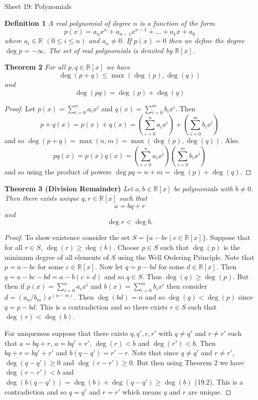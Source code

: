 \documentclass{article}
\begin{document}
\begin{flushleft}

\Large

Sheet 19: Polynomials\newline

\normalsize

\textbf{Definition 1}
\textsl{A real polynomial of degree $n$ is a function of the form
\[
p(x) = a_n x^n + a_{n-1} x^{n-1} + \dots + a_1 x + a_0
\]
where $a_i \in \mathbb{R}$ $(0 \leq i \leq n)$ and $a_n \neq 0$. If $p(x) = 0$ then we define the degree $\deg p = - \infty$. The set of real polynomials is denoted by $\mathbb{R}[x]$.}\newline

\textbf{Theorem 2}
\textsl{For all $p,q \in \mathbb{R}[x]$ we have
\[
\deg(p+q) \leq \max(\deg(p), \deg(q))
\]
and
\[
\deg(pq) = \deg(p) + \deg(q)
\]}
\begin{proof}
Let $p(x) = \sum_{i=0}^n a_i x^i$ and $q(x) = \sum_{i=0}^m b_i x^i$. Then
\[
p+q(x) = p(x) + q(x) = \left ( \sum_{i=0}^n a_i x^i \right ) + \left ( \sum_{i=0}^m b_i x^i \right )
\]
and so $\deg(p+q) = \max(n,m) = \max(\deg(p), \deg(q))$. Also
\[
pq(x) = p(x)q(x) = \left ( \sum_{i=0}^n a_i x^i \right ) \left ( \sum_{i=0}^m b_i x^i \right )
\]
and so using the product of powers $\deg pq = n+m = \deg(p) + \deg(q)$.
\end{proof}

\textbf{Theorem 3 (Division Remainder)}
\textsl{Let $a,b \in \mathbb{R}[x]$ be polynomials with $b \neq 0$. Then there exists unique $q,r \in \mathbb{R}[x]$ such that
\[
a = bq + r
\]
and
\[
\deg r < \deg b.
\]}
\begin{proof}
To show existence consider the set $S = \{a-bc \mid c \in \mathbb{R}[x]\}$. Suppose that for all $r \in S$, $\deg(r) \geq \deg(b)$. Choose $p \in S$ such that $\deg(p)$ is the minimum degree of all elements of $S$ using the Well Ordering Principle. Note that $p=a-bc$ for some $c \in \mathbb{R}[x]$. Now let $q = p-bd$ for some $d \in \mathbb{R}[x]$. Then $q = a-bc-bd=a-b(c+d)$ and so $q \in S$. Thus $\deg(q) \geq \deg(p)$. But then if $p(x) = \sum_{i=0}^n a_i x^i$ and $b(x) = \sum_{i=0}^m b_i x^i$ then consider $d = (a_n/b_m) x^{(n-m)}$. Then $\deg(bd) = n$ and so $\deg(q) < \deg(p)$ since $q = p-bd$. This is a contradiction and so there exists $r \in S$ such that $\deg(r) < \deg(b)$.\newline

For uniqueness suppose that there exists $q,q',r,r'$ with $q \neq q'$ and $r \neq r'$ such that $a=bq+r$, $a=bq'+r'$, $\deg(r) < b$ and $\deg(r') < b$. Then $bq+r = bq'+r'$ and $b(q-q') = r'-r$. Note that since $q \neq q'$ and $r \neq r'$, $\deg(q-q') \geq 0$ and $\deg(r-r') \geq 0$. But then using Theorem 2 we have $\deg(r-r') < b$ and $\deg(b(q-q')) = \deg(b) + \deg(q-q') \geq \deg(b)$ (19.2). This is a contradiction and so $q=q'$ and $r=r'$ which means $q$ and $r$ are unique.
\end{proof}


\end{flushleft}
\end{document}
